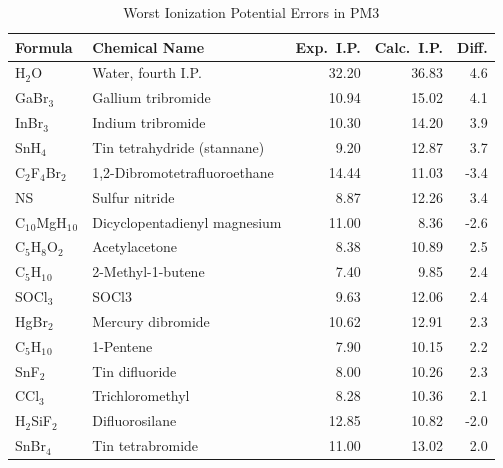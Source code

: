 \begin{table}
\caption{\label{weipm3} Worst Ionization Potential Errors in PM3}
\compresstable
\begin{center}
\begin{tabular}{llrrr} Formula & Chemical Name & Exp.\ I.P.         & Calc.\ I.P.         & Diff.\\
 \hline
 H$_2$O               & Water, fourth I.P.                     &   32.20   &    36.83   &    4.6\\
 GaBr$_3$             & Gallium tribromide                     &   10.94   &    15.02   &    4.1\\
 InBr$_3$             & Indium tribromide                      &   10.30   &    14.20   &    3.9\\
 SnH$_4$              & Tin tetrahydride (stannane)            &    9.20   &    12.87   &    3.7\\
 C$_2$F$_4$Br$_2$     & 1,2-Dibromotetrafluoroethane           &   14.44   &    11.03   &   -3.4\\
 NS                   & Sulfur nitride                         &    8.87   &    12.26   &    3.4\\
 C$_1$$_0$MgH$_1$$_0$ & Dicyclopentadienyl magnesium           &   11.00   &     8.36   &   -2.6\\
 C$_5$H$_8$O$_2$      & Acetylacetone                          &    8.38   &    10.89   &    2.5\\
 C$_5$H$_1$$_0$       & 2-Methyl-1-butene                      &    7.40   &     9.85   &    2.4\\
 SOCl$_3$             & SOCl3                                  &    9.63   &    12.06   &    2.4\\
 HgBr$_2$             & Mercury dibromide                      &   10.62   &    12.91   &    2.3\\
 C$_5$H$_1$$_0$       & 1-Pentene                              &    7.90   &    10.15   &    2.2\\
 SnF$_2$              & Tin difluoride                         &    8.00   &    10.26   &    2.3\\
 CCl$_3$              & Trichloromethyl                        &    8.28   &    10.36   &    2.1\\
 H$_2$SiF$_2$         & Difluorosilane                         &   12.85   &    10.82   &   -2.0\\
 SnBr$_4$             & Tin tetrabromide                       &   11.00   &    13.02   &    2.0\\

\end{tabular}
\end{center}
\end{table}
